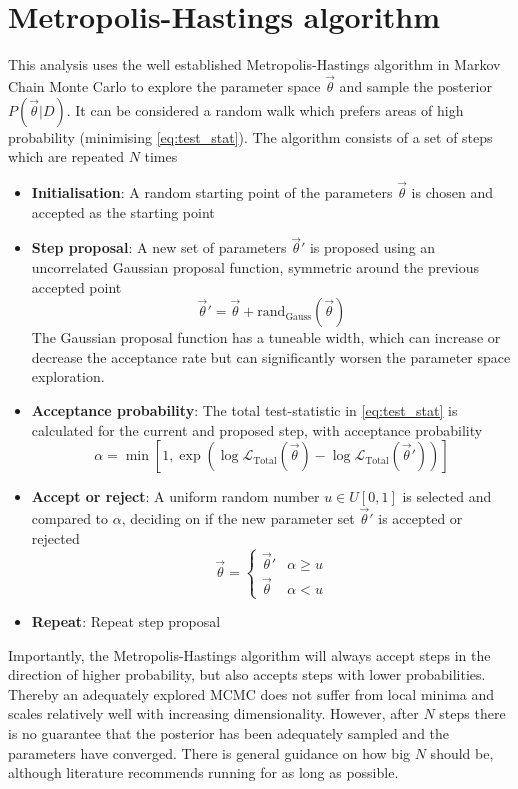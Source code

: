 \section{Metropolis-Hastings algorithm}
This analysis uses the well established Metropolis-Hastings algorithm\cite{metropolis,hastings} in Markov Chain Monte Carlo to explore the parameter space $\vec{\theta}$ and sample the posterior $P(\vec{\theta}|D)$. It can be considered a random walk which prefers areas of high probability (minimising \autoref{eq:test_stat}). The algorithm consists of a set of steps which are repeated $N$ times
\begin{itemize}
	\item \textbf{Initialisation}: A random starting point of the parameters $\vec{\theta}$ is chosen and accepted as the starting point
	\item \textbf{Step proposal}: A new set of parameters $\vec{\theta}'$ is proposed using an uncorrelated Gaussian proposal function, symmetric around the previous accepted point
	\begin{equation}
		\vec{\theta}' = \vec{\theta}+\text{rand}_{\text{Gauss}}(\vec{\theta})
	\end{equation}
	The Gaussian proposal function has a tuneable width, which can increase or decrease the acceptance rate but can significantly worsen the parameter space exploration.
	\item \textbf{Acceptance probability}: The total test-statistic in \autoref{eq:test_stat} is calculated for the current and proposed step, with acceptance probability
	\begin{equation}
		\alpha = \min \left[ 1, \exp\left(\log\mathcal{L}_\text{Total}(\vec{\theta}) - \log\mathcal{L}_\text{Total}(\vec{\theta}') \right)\right]
	\end{equation}
	\item \textbf{Accept or reject}: A uniform random number $u \in U[0,1]$ is selected and compared to $\alpha$, deciding on if the new parameter set $\vec{\theta}'$ is accepted or rejected
	\begin{equation}
	\vec{\theta} =
	\begin{cases}
		\vec{\theta}' & \alpha \ge u \\
		\vec{\theta} & \alpha < u
	\end{cases}
	\end{equation}
	\item \textbf{Repeat}: Repeat step proposal
\end{itemize}
Importantly, the Metropolis-Hastings algorithm will always accept steps in the direction of higher probability, but also accepts steps with lower probabilities. Thereby an adequately explored MCMC does not suffer from local minima and scales relatively well with increasing dimensionality. However, after $N$ steps there is no guarantee that the posterior has been adequately sampled and the parameters have converged. There is general guidance on how big $N$ should be, although literature recommends running for as long as possible\cite{mcmc_handbook}.

